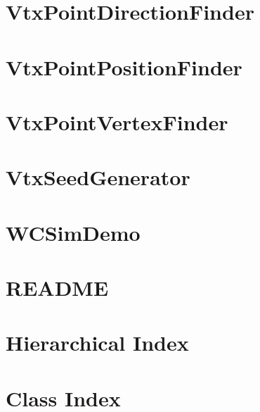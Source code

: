 \documentclass[twoside]{book}
\begin{document}
\chapter{Vtx\-Point\-Direction\-Finder}
\label{md_UserTools_VtxPointDirectionFinder_README}
\hypertarget{md_UserTools_VtxPointDirectionFinder_README}{}

\chapter{Vtx\-Point\-Position\-Finder}
\label{md_UserTools_VtxPointPositionFinder_README}
\hypertarget{md_UserTools_VtxPointPositionFinder_README}{}

\chapter{Vtx\-Point\-Vertex\-Finder}
\label{md_UserTools_VtxPointVertexFinder_README}
\hypertarget{md_UserTools_VtxPointVertexFinder_README}{}

\chapter{Vtx\-Seed\-Generator}
\label{md_UserTools_VtxSeedGenerator_README}
\hypertarget{md_UserTools_VtxSeedGenerator_README}{}

\chapter{W\-C\-Sim\-Demo}
\label{md_UserTools_WCSimDemo_README}
\hypertarget{md_UserTools_WCSimDemo_README}{}

\chapter{R\-E\-A\-D\-M\-E}
\label{md_DataModel_README}
\hypertarget{md_DataModel_README}{}

\chapter{Hierarchical Index}

\chapter{Class Index}

\end{document}
